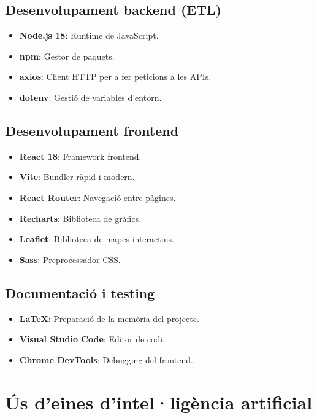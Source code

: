\subsection{Desenvolupament backend (ETL)}
\begin{itemize}
    \item \textbf{Node.js 18}: Runtime de JavaScript.
    \item \textbf{npm}: Gestor de paquets.
    \item \textbf{axios}: Client HTTP per a fer peticions a les APIs.
    \item \textbf{dotenv}: Gestió de variables d'entorn.
\end{itemize}

\subsection{Desenvolupament frontend}
\begin{itemize}
    \item \textbf{React 18}: Framework frontend.
    \item \textbf{Vite}: Bundler ràpid i modern.
    \item \textbf{React Router}: Navegació entre pàgines.
    \item \textbf{Recharts}: Biblioteca de gràfics.
    \item \textbf{Leaflet}: Biblioteca de mapes interactius.
    \item \textbf{Sass}: Preprocessador CSS.
\end{itemize}

\subsection{Documentació i testing}
\begin{itemize}
    \item \textbf{LaTeX}: Preparació de la memòria del projecte.
    \item \textbf{Visual Studio Code}: Editor de codi.
    \item \textbf{Chrome DevTools}: Debugging del frontend.
\end{itemize}


\section{Ús d'eines d'intel·ligència artificial}

